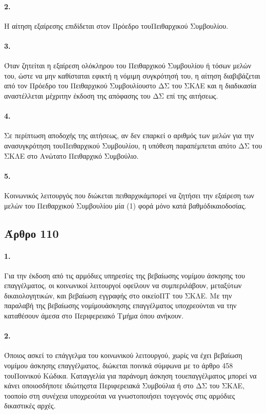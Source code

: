 \documentclass[a4paper,oneside, 10pt]{book}
\begin{document}
\paragraph { 2. } Η αίτηση εξαίρεσης επιδίδεται στον Πρόεδρο τουΠειθαρχικού Συμβουλίου.
\paragraph { 3. } Όταν ζητείται η εξαίρεση ολόκληρου του Πειθαρχικού Συμβουλίου ή τόσων μελών του, ώστε να μην καθίσταται εφικτή η νόμιμη συγκρότησή του, η αίτηση διαβιβάζεται από τον Πρόεδρο του Πειθαρχικού Συμβουλίουστο ΔΣ του ΣΚΛΕ και η διαδικασία αναστέλλεται μέχριτην έκδοση της απόφασης του ΔΣ επί της αιτήσεως.
\paragraph { 4. } Σε περίπτωση αποδοχής της αιτήσεως, αν δεν επαρκεί ο αριθμός των μελών για την ανασυγκρότηση τουΠειθαρχικού Συμβουλίου, η υπόθεση παραπέμπεται απότο ΔΣ του ΣΚΛΕ στο Ανώτατο Πειθαρχικό Συμβούλιο.
\paragraph { 5. } Κοινωνικός λειτουργός που διώκεται πειθαρχικάμπορεί να ζητήσει την εξαίρεση των μελών του Πειθαρχικού Συμβουλίου μία (1) φορά μόνο κατά βαθμόδικαιοδοσίας.
\subsection*{ Άρθρο 110 }
\paragraph { 1. } Για την έκδοση από τις αρμόδιες υπηρεσίες της βεβαίωσης νομίμου άσκησης του επαγγέλματος, οι κοινωνικοί λειτουργοί οφείλουν να συμπεριλάβουν, μεταξύτων δικαιολογητικών, και βεβαίωση εγγραφής στο οικείοΠΤ του ΣΚΛΕ. Με την παραλαβή της βεβαίωσης νομίμουάσκησης επαγγέλματος υποχρεούνται να την καταθέσουν άμεσα στο Περιφερειακό Τμήμα όπου ανήκουν.
\paragraph { 2. } Όποιος ασκεί το επάγγελμα του κοινωνικού λειτουργού, χωρίς να έχει βεβαίωση νομίμου άσκησης επαγγέλματος, διώκεται ποινικά σύμφωνα με το άρθρο 458 τουΠοινικού Κώδικα. Καταγγελία για παράνομη άσκηση τουεπαγγέλματος μπορεί να κάνει οποιοσδήποτε ιδιώτηςστα Περιφερειακά Συμβούλια ή στο ΔΣ του ΣΚΛΕ, τοοποίο στη συνέχεια υποχρεούται να γνωστοποιήσει τογεγονός στις αρμόδιες δικαστικές αρχές.
\end{document}
